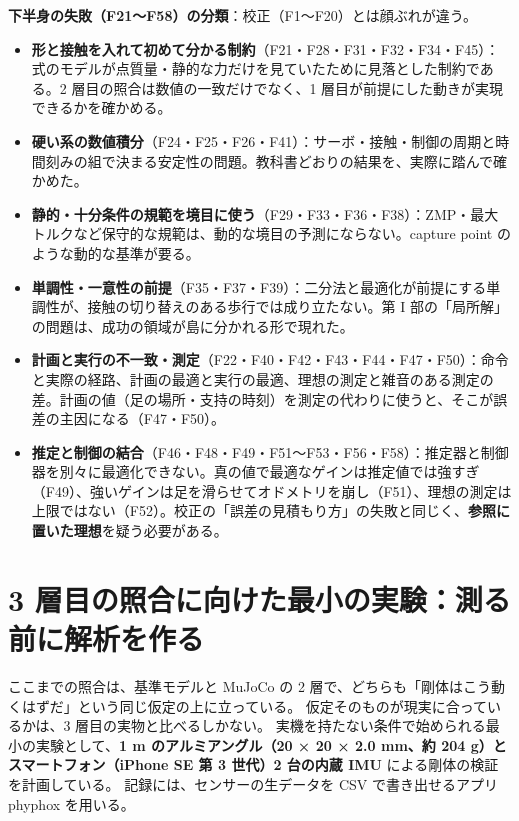 \documentclass[paper=a4paper,fontsize=10pt,twocolumn,column_gap=2zw,line_length=24zw,number_of_lines=46,head_space=20mm]{jlreq}
\begin{document}
\textbf{下半身の失敗（F21〜F58）の分類}：校正（F1〜F20）とは顔ぶれが違う。
\begin{itemize}\setlength{\itemsep}{0pt}
\item \textbf{形と接触を入れて初めて分かる制約}（F21・F28・F31・F32・F34・F45）：式のモデルが点質量・静的な力だけを見ていたために見落とした制約である。2 層目の照合は数値の一致だけでなく、1 層目が前提にした動きが実現できるかを確かめる。
\item \textbf{硬い系の数値積分}（F24・F25・F26・F41）：サーボ・接触・制御の周期と時間刻みの組で決まる安定性の問題。教科書どおりの結果を、実際に踏んで確かめた。
\item \textbf{静的・十分条件の規範を境目に使う}（F29・F33・F36・F38）：ZMP・最大トルクなど保守的な規範は、動的な境目の予測にならない。capture point のような動的な基準が要る。
\item \textbf{単調性・一意性の前提}（F35・F37・F39）：二分法と最適化が前提にする単調性が、接触の切り替えのある歩行では成り立たない。第 I 部の「局所解」の問題は、成功の領域が島に分かれる形で現れた。
\item \textbf{計画と実行の不一致・測定}（F22・F40・F42・F43・F44・F47・F50）：命令と実際の経路、計画の最適と実行の最適、理想の測定と雑音のある測定の差。計画の値（足の場所・支持の時刻）を測定の代わりに使うと、そこが誤差の主因になる（F47・F50）。
\item \textbf{推定と制御の結合}（F46・F48・F49・F51〜F53・F56・F58）：推定器と制御器を別々に最適化できない。真の値で最適なゲインは推定値では強すぎ（F49）、強いゲインは足を滑らせてオドメトリを崩し（F51）、理想の測定は上限ではない（F52）。校正の「誤差の見積もり方」の失敗と同じく、\textbf{参照に置いた理想}を疑う必要がある。
\end{itemize}


\section{3 層目の照合に向けた最小の実験：測る前に解析を作る}\label{sec:bangai}

ここまでの照合は、基準モデルと MuJoCo の 2 層で、どちらも「剛体はこう動くはずだ」という同じ仮定の上に立っている。
仮定そのものが現実に合っているかは、3 層目の実物と比べるしかない。
実機を持たない条件で始められる最小の実験として、\textbf{1 m のアルミアングル（20 × 20 × 2.0 mm、約 204 g）とスマートフォン（iPhone SE 第 3 世代）2 台の内蔵 IMU} による剛体の検証を計画している。
記録には、センサーの生データを CSV で書き出せるアプリ phyphox \cite{phyphox} を用いる。
\end{document}

